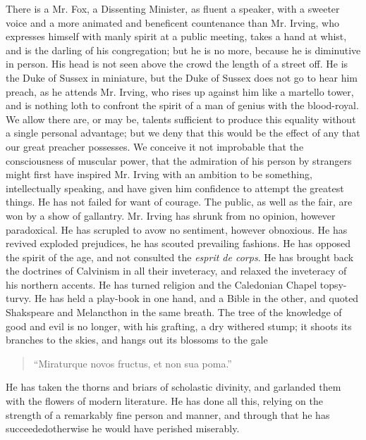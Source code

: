 There is a Mr. Fox, a Dissenting Minister, as fluent a speaker,
with a sweeter voice and a more animated and beneficent
countenance than Mr.  Irving, who expresses himself with manly
spirit at a public meeting, takes a hand at whist, and is the
darling of his congregation; but he is no more, because he is
diminutive in person. His head is not seen above the crowd the
length of a street off. He is the Duke of Sussex in miniature, but
the Duke of Sussex does not go to hear him preach, as he attends
Mr. Irving, who rises up against him like a martello tower, and is
nothing loth to confront the spirit of a man of genius with the
blood-royal. We allow there are, or may be, talents sufficient to
produce this equality without a single personal advantage; but we
deny that this would be the effect of any that our great preacher
possesses.  We conceive it not improbable that the consciousness
of muscular power, that the admiration of his person by strangers
might first have inspired Mr. Irving with an ambition to be
something, intellectually speaking, and have given him confidence
to attempt the greatest things. He has not failed for want of
courage. The public, as well as the fair, are won by a show of
gallantry. Mr. Irving has shrunk from no opinion, however
paradoxical. He has scrupled to avow no sentiment, however
obnoxious. He has revived exploded prejudices, he has scouted
prevailing fashions.  He has opposed the spirit of the age, and
not consulted the \emph{esprit de corps}. He has brought back the
doctrines of Calvinism in all their inveteracy, and relaxed the
inveteracy of his northern accents. He has turned religion and the
Caledonian Chapel topsy-turvy. He has held a play-book in one
hand, and a Bible in the other, and quoted Shakspeare and
Melancthon in the same breath. The tree of the knowledge of good
and evil is no longer, with his grafting, a dry withered stump; it
shoots its branches to the skies, and hangs out its blossoms to
the gale
\begin{quote}
  ``Miraturque novos fructus, et non sua poma.''
\end{quote}
He has taken the thorns and briars of scholastic divinity, and
garlanded them with the flowers of modern literature. He has done
all this, relying on the strength of a remarkably fine person and
manner, and through that he has succeeded\textemdash otherwise he
would have perished miserably.

